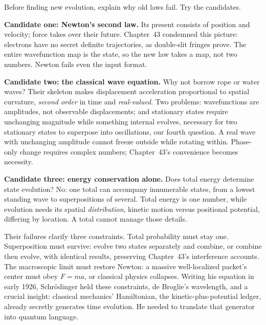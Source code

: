 
Before finding new evolution, explain why old laws fail. Try the candidates.

\textbf{Candidate one: Newton's second law.} Its present consists of position and velocity; force takes over their future. Chapter~43 condemned this picture: electrons have no secret definite trajectories, as double-slit fringes prove. The entire wavefunction map is the state, so the new law takes a map, not two numbers. Newton fails even the input format.

\textbf{Candidate two: the classical wave equation.} Why not borrow rope or water waves? Their skeleton makes displacement acceleration proportional to spatial curvature, \emph{second order} in time and \emph{real-valued}. Two problems: wavefunctions are amplitudes, not observable displacements; and stationary states require unchanging magnitude while something internal evolves, necessary for two stationary states to superpose into oscillations, our fourth question. A real wave with unchanging amplitude cannot freeze outside while rotating within. Phase-only change requires complex numbers; Chapter~43's convenience becomes necessity.

\textbf{Candidate three: energy conservation alone.} Does total energy determine state evolution? No: one total can accompany innumerable states, from a lowest standing wave to superpositions of several. Total energy is one number, while evolution needs its spatial \emph{distribution}, kinetic motion versus positional potential, differing by location. A total cannot manage those details.

Their failures clarify three constraints. Total probability must stay one. Superposition must survive: evolve two states separately and combine, or combine then evolve, with identical results, preserving Chapter~43's interference accounts. The macroscopic limit must restore Newton: a massive well-localized packet's center must obey \(F=ma\), or classical physics collapses. Writing his equation in early 1926, Schrödinger held these constraints, de Broglie's wavelength, and a crucial insight: classical mechanics' Hamiltonian, the kinetic-plus-potential ledger, already secretly generates time evolution. He needed to translate that generator into quantum language.


